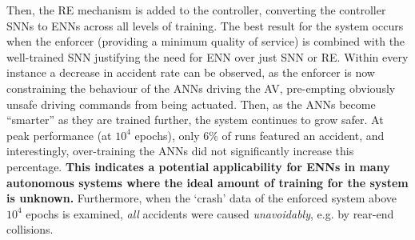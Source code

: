 Then, the \ac{RE} mechanism is added to the controller, converting the
controller \acp{SNN} to \acp{ENN} across all levels of training.
The best result for the system occurs when the enforcer (providing a
minimum quality of service) is combined with the well-trained \ac{SNN}
justifying the need for \ac{ENN} over just \ac{SNN} or \ac{RE}.
Within every instance a decrease in accident rate can be observed, as the enforcer is now constraining the behaviour of the \acp{ANN} driving the \ac{AV}, pre-empting obviously unsafe driving commands from being actuated.
Then, as the \acp{ANN} become ``smarter'' as they are trained further, the system continues to grow safer. 
At peak performance (at $10^4$ epochs), only 6\% of runs featured an accident, and interestingly, over-training the \acp{ANN} did not significantly increase this percentage.
\textbf{This indicates a potential applicability for \acp{ENN} in many autonomous systems where the ideal amount of training for the system is unknown.}
Furthermore, when the `crash' data of the enforced system above $10^4$ epochs is examined, \emph{all} accidents were caused \emph{unavoidably}, e.g. by rear-end collisions.









